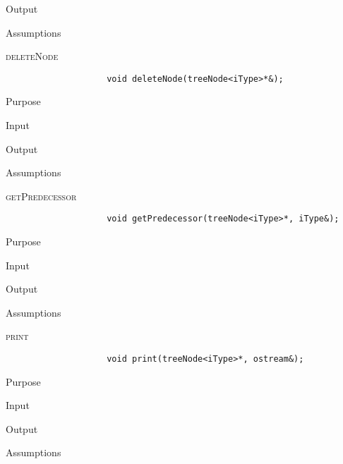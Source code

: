\documentclass[pdftex, 12pt]{article}
\begin{document}
\begin{description}
\begin{description}
\begin{description}
\begin{description}
					\item{Output}

					\item{Assumptions}

				\end{description}
			\item{\textsc{deleteNode}}
				\begin{lstlisting}
					void deleteNode(treeNode<iType>*&);
				\end{lstlisting}
				\begin{description}

					\item{Purpose}

					\item{Input}

					\item{Output}

					\item{Assumptions}

				\end{description}
			\item{\textsc{getPredecessor}}
				\begin{lstlisting}
					void getPredecessor(treeNode<iType>*, iType&);
				\end{lstlisting}
				\begin{description}

					\item{Purpose}

					\item{Input}

					\item{Output}

					\item{Assumptions}

				\end{description}
			\item{\textsc{print}}
				\begin{lstlisting}
					void print(treeNode<iType>*, ostream&);
				\end{lstlisting}
				\begin{description}

					\item{Purpose}

					\item{Input}

					\item{Output}

					\item{Assumptions}


\end{description}
\end{description}
\end{description}
\end{description}
\end{document}
